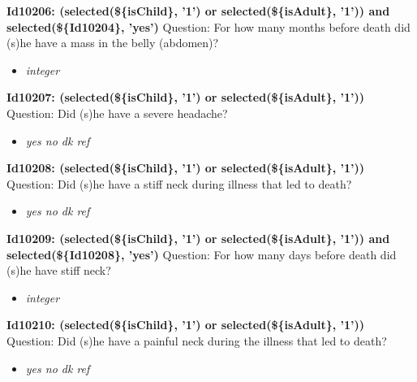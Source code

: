 \documentclass{article}%
\begin{document}
\textbf{Id10206: (selected(\$\{isChild\}, '1') or selected(\$\{isAdult\}, '1')) and selected(\$\{Id10204\}, 'yes')\newline%
}%
Question: For how many months before death did (s)he have a mass in the belly (abdomen)?\newline%
%
\begin{itemize}%
\item%
\textit{integer\newline%
}%
\end{itemize}%
\textbf{Id10207: (selected(\$\{isChild\}, '1') or selected(\$\{isAdult\}, '1'))\newline%
}%
Question: Did (s)he have a severe headache?\newline%
%
\begin{itemize}%
\item%
\textit{yes\newline%
 no\newline%
 dk\newline%
 ref\newline%
}%
\end{itemize}%
\textbf{Id10208: (selected(\$\{isChild\}, '1') or selected(\$\{isAdult\}, '1'))\newline%
}%
Question: Did (s)he have a stiff neck during illness that led to death?\newline%
%
\begin{itemize}%
\item%
\textit{yes\newline%
 no\newline%
 dk\newline%
 ref\newline%
}%
\end{itemize}%
\textbf{Id10209: (selected(\$\{isChild\}, '1') or selected(\$\{isAdult\}, '1')) and selected(\$\{Id10208\}, 'yes')\newline%
}%
Question: For how many days before death did (s)he have stiff neck?\newline%
%
\begin{itemize}%
\item%
\textit{integer\newline%
}%
\end{itemize}%
\textbf{Id10210: (selected(\$\{isChild\}, '1') or selected(\$\{isAdult\}, '1'))\newline%
}%
Question: Did (s)he have a painful neck during the illness that led to death?\newline%
%
\begin{itemize}%
\item%
\textit{yes\newline%
 no\newline%
 dk\newline%
 ref\newline%
}%
\end{itemize}%
\end{document}
